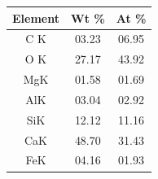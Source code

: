 \begin{minipage}{\textwidth}
\begin{minipage}[b]{0.32\textwidth}
    \label{fig:00-01-select}
  \end{minipage}
  \hfill
  \begin{minipage}[b]{0.32\textwidth}
    \centering
    \begin{tabular}{|c|c|c|}
      \hline
      Element & Wt \% & At \% \\ \hline
      C K     & 03.23 & 06.95 \\ \hline
      O K     & 27.17 & 43.92 \\ \hline
      MgK     & 01.58 & 01.69 \\ \hline
      AlK     & 03.04 & 02.92 \\ \hline
      SiK     & 12.12 & 11.16 \\ \hline
      CaK     & 48.70 & 31.43 \\ \hline
      FeK     & 04.16 & 01.93 \\ \hline
    \end{tabular}
    \label{tab:00-01}
  \end{minipage}
\end{minipage}

